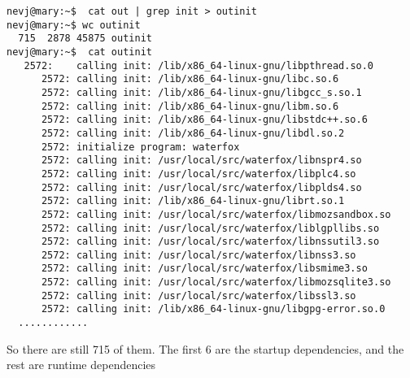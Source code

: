 \documentclass{article}  %
\begin{document}
\begin{verbatim}
nevj@mary:~$  cat out | grep init > outinit
nevj@mary:~$ wc outinit
  715  2878 45875 outinit
nevj@mary:~$  cat outinit
   2572:	calling init: /lib/x86_64-linux-gnu/libpthread.so.0
      2572:	calling init: /lib/x86_64-linux-gnu/libc.so.6
      2572:	calling init: /lib/x86_64-linux-gnu/libgcc_s.so.1
      2572:	calling init: /lib/x86_64-linux-gnu/libm.so.6
      2572:	calling init: /lib/x86_64-linux-gnu/libstdc++.so.6
      2572:	calling init: /lib/x86_64-linux-gnu/libdl.so.2
      2572:	initialize program: waterfox
      2572:	calling init: /usr/local/src/waterfox/libnspr4.so
      2572:	calling init: /usr/local/src/waterfox/libplc4.so
      2572:	calling init: /usr/local/src/waterfox/libplds4.so
      2572:	calling init: /lib/x86_64-linux-gnu/librt.so.1
      2572:	calling init: /usr/local/src/waterfox/libmozsandbox.so
      2572:	calling init: /usr/local/src/waterfox/liblgpllibs.so
      2572:	calling init: /usr/local/src/waterfox/libnssutil3.so
      2572:	calling init: /usr/local/src/waterfox/libnss3.so
      2572:	calling init: /usr/local/src/waterfox/libsmime3.so
      2572:	calling init: /usr/local/src/waterfox/libmozsqlite3.so
      2572:	calling init: /usr/local/src/waterfox/libssl3.so
      2572:	calling init: /lib/x86_64-linux-gnu/libgpg-error.so.0
  ............
\end{verbatim}
  
So there are still 715 of them. The first 6 are the startup dependencies, and the rest are runtime dependencies
\end{document}
